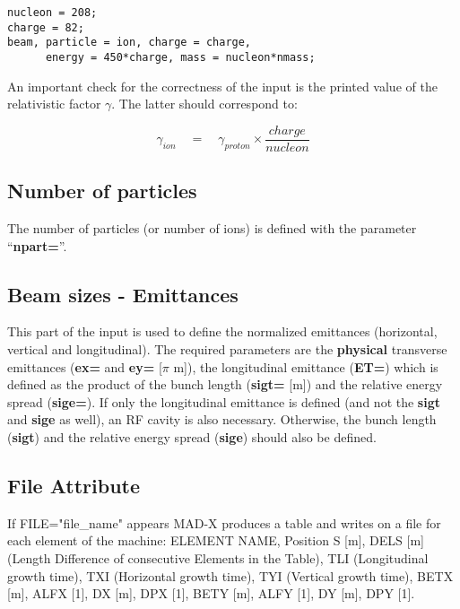 \begin{verbatim}
nucleon = 208; 
charge = 82; 
beam, particle = ion, charge = charge,
      energy = 450*charge, mass = nucleon*nmass;  
\end{verbatim}

An important check for the correctness of the input is the printed value
of the relativistic factor  $\gamma$. The latter should correspond to:   

%  

\[
\gamma_{ion} \quad = \quad \gamma_{proton} \times \frac{charge}{nucleon}
\]

\subsection{Number of particles}
The number of particles (or number of ions) is defined with the
parameter ``\textbf{npart=}''.  

\subsection{Beam sizes - Emittances}
This part of the input is used to define the normalized emittances
(horizontal, vertical and longitudinal). The required parameters are the
\textbf{physical} transverse emittances (\textbf{ex=} and \textbf{ey=}
[$\pi$ m]), the longitudinal emittance (\textbf{ET=}) which is
defined    as the product of the bunch length (\textbf{sigt=}
[m]) and the relative energy spread (\textbf{sige=}). If only
the longitudinal emittance is defined (and not the \textbf{sigt}
and \textbf{sige} as well), an RF cavity is also
necessary. Otherwise, the bunch length (\textbf{sigt}) and the
relative energy spread (\textbf{sige}) should also be defined.   

\subsection{File Attribute}
If FILE="file\_name" appears MAD-X produces a table and writes on a file
for each element of the machine: ELEMENT NAME, Position S [m], DELS [m]
(Length Difference of consecutive Elements in the Table),  TLI
(Longitudinal growth time), TXI (Horizontal growth time), TYI (Vertical
growth time), BETX [m], ALFX [1], DX [m], DPX [1], BETY [m], ALFY [1],
DY [m], DPY [1].  

